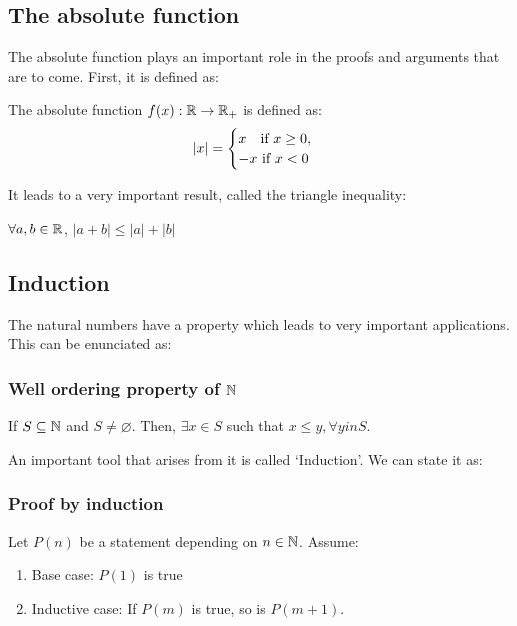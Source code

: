 \subsection{The absolute function}

The absolute function plays an important role in the proofs and arguments that are to come. First, it is defined as:

\begin{definition}
    The absolute function $f(x): \mathbb{R} \to \mathbb{R}_+$ is defined as:
    \begin{equation*}
        |x| = \begin{cases}
            x \: \: \:\textnormal{ if } x \geq 0, \\
            -x \textnormal{ if } x < 0
        \end{cases}
    \end{equation*}
\end{definition}

It leads to a very important result, called the triangle inequality:

\begin{theorem}
    $\forall a, b \in \mathbb{R}$, $|a+b| \leq |a| + |b|$
\end{theorem}

\subsection{Induction}

The natural numbers have a property which leads to very important applications. This can be enunciated as:

\subsubsection{Well ordering property of $\mathbb{N}$}

If $S \subseteq \mathbb{N}$ and $S \neq \varnothing$. Then, $\exists x \in S$ such that $x \leq y, \forall y in S$.

An important tool that arises from it is called `Induction'. We can state it as:

\subsubsection{Proof by induction}

Let $P(n)$ be a statement depending on $n \in \mathbb{N}$. Assume:

\begin{enumerate}
    \item Base case: $P(1)$ is true
    \item Inductive case: If $P(m)$ is true, so is $P(m+1)$.
\end{enumerate}

